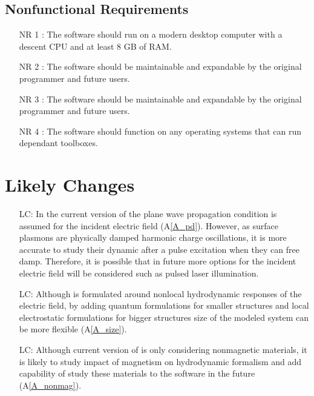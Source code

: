 \documentclass[12pt]{article}
\newcounter{lcnum} %
\begin{document}
	\subsection{Nonfunctional Requirements}
	
	\begin{itemize} 
		
		\item[NR 1 \label{NR_RAM}:] The software should run on a modern
		desktop computer with a descent CPU and at least 8 GB of RAM.
		
		\item[NR 2 \label{R_update}:] The software should be maintainable and
		expandable by the original programmer and future users.
		
		
		\item[NR 3 \label{R_update}:] The software should be maintainable and
		expandable by the original programmer and future users.
		
		\item[NR 4 \label{R_compatibility}:] The software should function on any
		operating systems that can run dependant toolboxes. \end{itemize}
	
	
	\section{Likely Changes}
	
	\noindent \begin{itemize}
		
		\item[LC\refstepcounter{lcnum}\thelcnum\label{LC_lightsource}:] In the current
		version of the \progname{} plane wave propagation condition is assumed for the
		incident electric field (A\ref{A_pd}). However, as surface plasmons are
		physically damped harmonic charge oscillations, it is more accurate to study
		their dynamic after a pulse excitation when they can free damp. Therefore, it is
		possible that in future more options for the incident electric field will be
		considered such as pulsed laser illumination.
		
		\item[LC\refstepcounter{lcnum}\thelcnum\label{LC_size}:] Although \progname{} is
		formulated around nonlocal hydrodynamic responses of the electric field, by
		adding quantum formulations for smaller structures and local electrostatic
		formulations for bigger structures size of the modeled system can be more
		flexible (A\ref{A_size}).
		
		
		\item[LC\refstepcounter{lcnum}\thelcnum\label{LC_magnetism}:] Although current
		version of \progname{} is only considering nonmagnetic materials, it is likely
		to study impact of magnetism on hydrodynamic formalism and add capability of
		study these materials to the software in the future (A\ref{A_nonmag}).
		
	\end{itemize}
	
\end{document}
